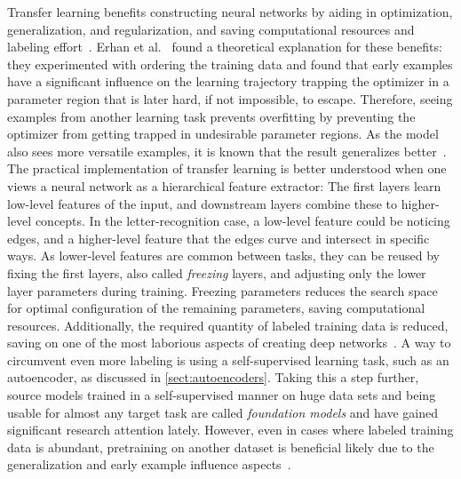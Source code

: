 \documentclass[english,twoside,openright]{UH_DS_MSc}
\begin{document}
Transfer learning benefits constructing neural networks 
by aiding in optimization, generalization, and regularization, and saving computational resources and labeling effort~\cite{erhanWhyDoesUnsupervised2010, transferlearning_survey}.
Erhan et al.~\cite{erhanWhyDoesUnsupervised2010} found a theoretical explanation for these benefits: they
experimented with ordering the training data and found 
that early examples have a significant influence on the learning trajectory trapping the optimizer in a parameter region that is later hard, 
if not impossible, to escape. Therefore, seeing examples from another learning task prevents overfitting by preventing the optimizer from getting trapped in undesirable parameter regions. As the model also sees more versatile examples, it is known that the result generalizes better~\cite{transferlearning_survey}.
The practical implementation of transfer learning is better understood when one views a neural network as a hierarchical feature extractor:
The first layers learn low-level features of the input, and downstream layers combine these to higher-level concepts.
In the letter-recognition case, a low-level feature could be noticing edges, and a higher-level feature that the edges curve and intersect in 
specific ways. As lower-level features are common between tasks, they can be reused by fixing the first layers, also called \textit{freezing} layers,
and adjusting only the lower layer parameters during training.
Freezing parameters reduces the search space for optimal configuration of the remaining parameters, saving computational resources. Additionally, the required quantity of labeled training data is reduced, saving on one of the most laborious aspects of creating deep networks~\cite{engbook}.
A way to circumvent even more labeling is using a self-supervised learning task, such as an autoencoder, as discussed in \ref{sect:autoencoders}. Taking this a step further, source models trained in a self-supervised manner on huge data sets and being usable for almost any target task are called \textit{foundation models} and have gained significant research attention lately. However, even in cases where labeled training data is abundant, pretraining on another dataset is beneficial likely due to the generalization and early example influence aspects~\cite{erhanWhyDoesUnsupervised2010}.
\end{document}
